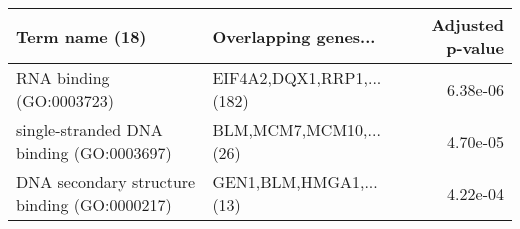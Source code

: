 \begin{tabular}{llr}
\toprule
                              Term name (18) &      Overlapping genes... &  Adjusted p-value \\
\midrule
                    RNA binding (GO:0003723) & EIF4A2,DQX1,RRP1,...(182) &          6.38e-06 \\
    single-stranded DNA binding (GO:0003697) &    BLM,MCM7,MCM10,...(26) &          4.70e-05 \\
DNA secondary structure binding (GO:0000217) &    GEN1,BLM,HMGA1,...(13) &          4.22e-04 \\
\bottomrule
\end{tabular}
